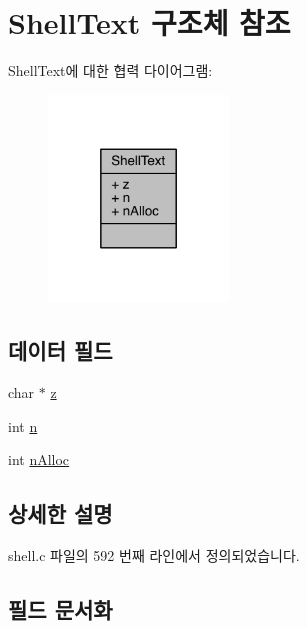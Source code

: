 \hypertarget{struct_shell_text}{}\section{Shell\+Text 구조체 참조}
\label{struct_shell_text}


Shell\+Text에 대한 협력 다이어그램\+:
\nopagebreak
\begin{figure}[H]
\begin{center}
\leavevmode
\includegraphics[width=136pt]{d0/d84/struct_shell_text__coll__graph}
\end{center}
\end{figure}
\subsection*{데이터 필드}
\begin{DoxyCompactItemize}
\item 
char $\ast$ \hyperlink{struct_shell_text_ad7acc0c56c1066a865700d2f472b7069}{z}
\item 
int \hyperlink{struct_shell_text_a8b8addc0530be548b9f118dc90ef6d30}{n}
\item 
int \hyperlink{struct_shell_text_a44c20e5561668de289aa47e7d65e8ead}{n\+Alloc}
\end{DoxyCompactItemize}


\subsection{상세한 설명}


shell.\+c 파일의 592 번째 라인에서 정의되었습니다.



\subsection{필드 문서화}
\mbox{\label{struct_shell_text_a8b8addc0530be548b9f118dc90ef6d30}} 
